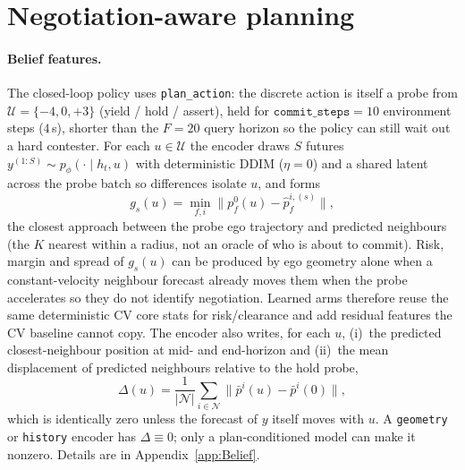 \documentclass[conference]{IEEEtran}
\begin{document}
\section{Negotiation-aware planning}
\label{sec:planning}

\paragraph{Belief features.} The closed-loop policy uses \texttt{plan\_action}:
the discrete action is itself a probe from
$\mathcal{U}=\{-4,0,+3\}$ (yield / hold / assert), held for
$\texttt{commit\_steps}=10$ environment steps ($4$\,s), shorter than the
$F{=}20$ query horizon so the policy can still wait out a hard contester. For each $u \in \mathcal{U}$ the encoder draws
$S$ futures $y^{(1:S)} \sim p_\phi(\cdot \mid h_t, u)$ with deterministic DDIM
($\eta{=}0$) and a shared latent across the probe batch so differences isolate
$u$, and forms
\begin{equation}
g_s(u) = \min_{f,i} \big\| p^0_f(u) - \hat p^{i,(s)}_f \big\|,
\label{eq:clearance}
\end{equation}
the closest approach between the probe ego trajectory and predicted neighbours
(the $K$ nearest within a radius, not an oracle of who is about to commit).
Risk, margin and spread of $g_s(u)$ can be produced by ego geometry alone when a
constant-velocity neighbour forecast already moves them when the probe
accelerates so they do not identify negotiation. Learned arms therefore
reuse the same deterministic CV core stats for risk/clearance and add residual
features the CV baseline cannot copy. The encoder also writes, for each $u$,
(i)~the predicted closest-neighbour position at mid- and end-horizon and
(ii)~the mean displacement of predicted neighbours relative to the hold probe,
\begin{equation}
\Delta(u)=\frac{1}{|\mathcal{N}|}\sum_{i\in\mathcal{N}}
\big\| \bar p^{i}(u) - \bar p^{i}(0) \big\|,
\label{eq:delta}
\end{equation}
which is identically zero unless the forecast of $y$ itself moves with $u$. A \texttt{geometry} or \texttt{history} encoder has $\Delta\equiv 0$; only a plan-conditioned model can make it nonzero. Details are in Appendix~\ref{app:Belief}.
\end{document}
